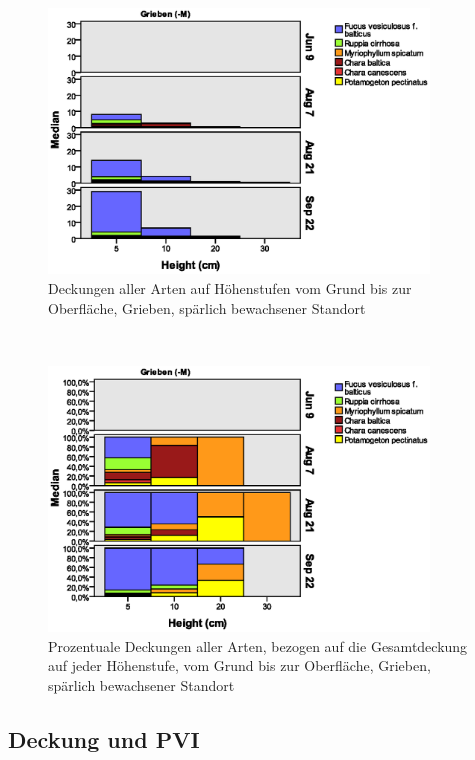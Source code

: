 \begin{figure}[!htb]
\centering
\includegraphics[width=0.90\textwidth]{images/Wuchshoehenkartierung/Grieben-M1.eps}
\caption[Höhenstufenkartierung Grieben (-M)]{Deckungen aller Arten auf Höhenstufen vom Grund bis zur Oberfläche, Grieben, spärlich bewachsener Standort}
\label{fig:wuchshoehen_grieben_-m1}
\end{figure}
\\
\begin{figure}[!htb]
\centering
\includegraphics[width=0.90\textwidth]{images/Wuchshoehenkartierung/Grieben-M2.eps}
\caption[prozentuale Höhenstufenkartierung Grieben (-M)]{Prozentuale Deckungen aller Arten, bezogen auf die Gesamtdeckung auf jeder Höhenstufe, vom Grund bis zur Oberfläche, Grieben, spärlich bewachsener Standort}
\label{fig:wuchshoehen_grieben_-m2}
\end{figure}


\FloatBarrier


\subsection{Deckung und PVI}

